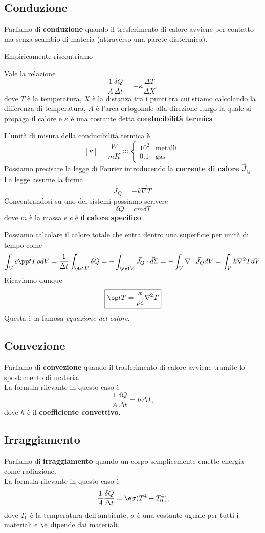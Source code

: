 \documentclass[a4paper]{report}
\begin{document}
\subsection{Conduzione}
Parliamo di \textbf{conduzione} quando il tresferimento di calore avviene per contatto ma senza scambio di materia (attraverso una parete diatermica).\medskip

\noindent Empiricamente riscontriamo
\begin{fact}
Vale la relazione
\[\frac1A\frac{\delta Q}{\Delta t}=-\kappa\frac{\Delta T}{\Delta X},\]
dove $T$ \`e la temperatura, $X$ \`e la distanza tra i punti tra cui stiamo calcolando la differenza di temperatura, $A$ \`e l'area ortogonale alla direzione lungo la quale si propaga il calore e $\kappa$ \`e una costante detta \textbf{conducibilit\`a termica}.
\end{fact}

\noindent L'unit\`a di misura della conducibilit\`a termica \`e
\[[\kappa]=\frac W{mK}\approx \begin{cases}
10^2 &\text{metalli}\\
0.1 &\text{gas}
\end{cases}.\]
\noindent Possiamo precisare la legge di Fourier introducendo la
\textbf{corrente di calore} $\vec J_Q$. La legge assume la forma
\[\vec J_Q=-k\vec \nabla T.\]
Concentrandosi su uno dei sistemi possiamo scrivere
\[\boxed{\delta Q= cm\delta T}\]
dove $m$ \`e la massa e $c$ \`e il \textbf{calore specifico}.\bigskip

\noindent Possiamo calcolare il calore totale che entra dentro una superficie per unit\`a di tempo come
\[\int_V c\pp tT\rho dV=\frac1{\Delta t}\int_{\del V} \delta Q=-\int_{\del V} \vec J_Q\cdot \vec d\Sigma=-\int_V \nabla \cdot \vec J_Q dV=\int_Vk\nabla^2 T dV.\]
Ricaviamo dunque
\[\boxed{\pp tT=\frac{\kappa}{\rho c}\nabla^2T}\]
Questa \`e la famosa \textit{equazione del calore}.

\subsection{Convezione}
Parliamo di \textbf{convezione} quando il trasferimento di calore avviene tramite lo spostamento di materia.\\ La formula rilevante in questo caso \`e
\[\frac1A\frac{\delta Q}{\Delta t}=h\Delta T,\]
dove $h$ \`e il \textbf{coefficiente convettivo}.

\subsection{Irraggiamento}
Parliamo di \textbf{irraggiamento} quando un corpo semplicemente emette energia come radiazione.\\ 
La formula rilevante in questo caso \`e
\[\frac1A\frac{\delta Q}{\Delta t}=\e \sigma(T^4-T_0^4),\]
dove $T_0$ \`e la temperatura dell'ambiente, $\sigma$ \`e una costante uguale per tutti i materiali e $\e$ dipende dai materiali.
\end{document}
